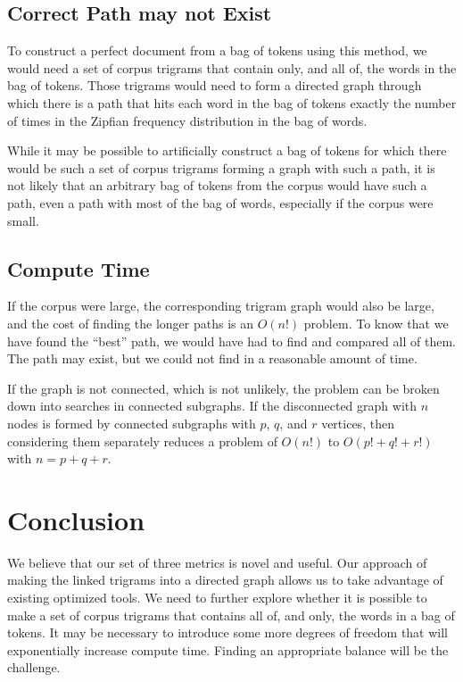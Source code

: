 \documentclass[11pt]{article}
\begin{document}
\subsection{Correct Path may not Exist}

To construct a perfect document from a bag of tokens using this method, we would need a set of corpus trigrams that contain only, and all of, the words in the bag of tokens.  Those trigrams would need to form a directed graph through which there is a path that hits each word in the bag of tokens exactly the number of times in the Zipfian frequency distribution in the bag of words.  

While it may be possible to artificially construct a bag of tokens for which there would be such a set of corpus trigrams forming a graph with such a path, it is not likely that an arbitrary bag of tokens from the corpus would have such a path, even a path with most of the bag of words, especially if the corpus were small.  

\subsection{Compute Time}

If the corpus were large, the corresponding trigram graph would also be large, and the cost of finding the longer paths is an $O(n!)$ problem.  To know that we have found the ``best'' path, we would have had to find and compared all of them.  The path may exist, but we could not find  in a reasonable amount of time.  

If the graph is not connected, which is not unlikely, the problem can be broken down into searches in connected subgraphs.  If the disconnected graph with $n$ nodes is formed by connected subgraphs with $p$, $q$, and $r$ vertices, then considering them separately reduces a problem of $O(n!)$ to $O(p!+q!+r!)$ with $n= p+q+r$.  

\section{Conclusion}

We believe that our set of three metrics is novel and useful.  Our approach of making the linked trigrams into a directed graph allows us to take advantage of existing optimized tools.  We need to further explore whether it is possible to make a set of corpus trigrams that contains all of, and only, the words in a bag of tokens.  It may be necessary to introduce some more degrees of freedom that will exponentially increase compute time.  Finding an appropriate balance will be the challenge.  
\end{document}
